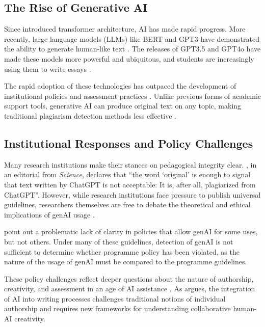 \subsection{The Rise of Generative AI}\label{ssec:genai_rise}
Since \textcite{ashish_vaswani_attention_2017} introduced transformer architecture, AI has made rapid progress. More recently, large language models (LLMs) like BERT and GPT3 have demonstrated the ability to generate human-like text \cite{jacob_devlin_bert_2018,brown_language_2020}. The releases of GPT3.5 and GPT4o have made these models more powerful and ubiquitous, and students are increasingly using them to write essays \cite{openai_gpt-4_2023,dehouche_plagiarism_2021}.

The rapid adoption of these technologies has outpaced the development of institutional policies and assessment practices \cite{cotton2023chatting}. Unlike previous forms of academic support tools, generative AI can produce original text on any topic, making traditional plagiarism detection methods less effective \cite{mitchell_detectgpt_2023}.

\subsection{Institutional Responses and Policy Challenges}\label{ssec:institutional_responses}
Many research institutions make their stances on pedagogical integrity clear. \textcite{h_holden_thorp_chatgpt_2023}, in an editorial from \emph{Science}, declares that ``the word `original' is enough to signal that text written by ChatGPT is not acceptable: It is, after all, plagiarized from ChatGPT''. However, while research institutions face pressure to publish universal guidelines, researchers themselves are free to debate the theoretical and ethical implications of genAI usage \cite{lav_r_varshney_limits_2020,h_holden_thorp_chatgpt_2023,yu_huang_reflection_2023}.

\textcite{MikePerkins_JasperRoe_2023} point out a problematic lack of clarity in policies that allow genAI for some uses, but not others. Under many of these guidelines, detection of genAI is not sufficient to determine whether programme policy has been violated, as the nature of the usage of genAI must be compared to the programme guidelines.

These policy challenges reflect deeper questions about the nature of authorship, creativity, and assessment in an age of AI assistance \cite{floridi2023ai}. As \textcite{beck2023human} argues, the integration of AI into writing processes challenges traditional notions of individual authorship and requires new frameworks for understanding collaborative human-AI creativity.

